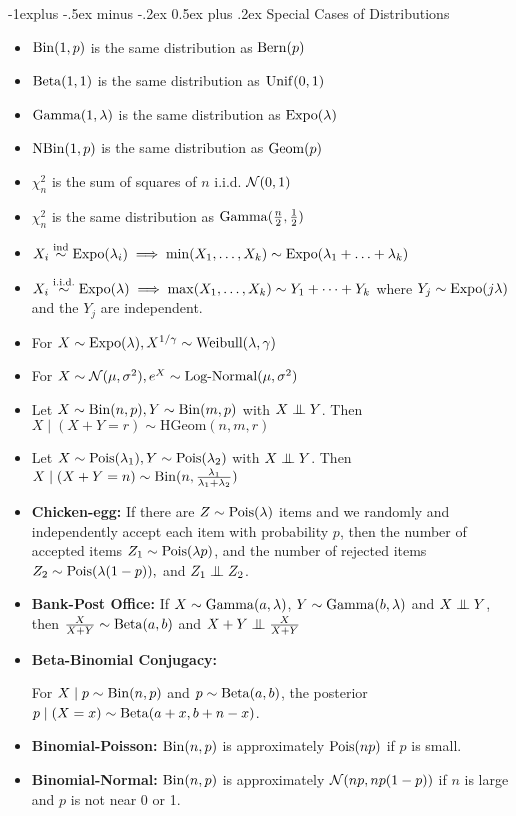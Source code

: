 \documentclass[10pt,landscape]{article}
\makeatletter
\newcommand\independent{\protect\mathpalette{\protect\independenT}{\perp}}
\def\independenT#1#2{\mathrel{\setbox0\hbox{$#1#2$}%
    \copy0\kern-\wd0\mkern4mu\box0}}
\renewcommand{\subsection}{\@startsection{subsection}{2}{0mm}%
                                {-1explus -.5ex minus -.2ex}%
                                {0.5ex plus .2ex}%
                                {\normalfont\normalsize\bfseries}}
\makeatother
\begin{document}
\begin{multicols*}{3}
\subsection{Special Cases of Distributions}
\begin{itemize}
    \item $\operatorname{Bin}(1,p)$ is the same distribution as $\operatorname{Bern}(p)$
    \item $\operatorname{Beta}(1,1)$ is the same distribution as $\operatorname{Unif}(0,1)$
    \item $\operatorname{Gamma}(1,\lambda)$ is the same distribution as $\operatorname{Expo}(\lambda)$
    \item $\operatorname{NBin}(1,p)$ is the same distribution as $\operatorname{Geom}(p)$
    \item $\chi_n^2$ is the sum of squares of $n$ i.i.d. $\mathcal{N}(0,1)$
    \item $\chi_n^2$ is the same distribution as $\operatorname{Gamma}(\frac{n}{2},\frac{1}{2})$
    \item  $X_i\stackrel{\text{ind}}{\sim}\operatorname{Expo}(\lambda_i)\implies\min(X_1,\ldots,X_k)\sim\operatorname{Expo}(\lambda_1+\ldots+\lambda_k)$
    \item  $X_i\stackrel{\text{i.i.d.}}{\sim}\operatorname{Expo}(\lambda)\implies\max(X_1,\ldots,X_k)\sim Y_1+\cdots+Y_k$ where $Y_j\sim\operatorname{Expo}(j\lambda)$ and the $Y_j$ are independent.
    \item For $X\sim \operatorname{Expo}(\lambda),X^{1/\gamma}\sim\text{Weibull}(\lambda,\gamma)$
    \item For $X\sim \mathcal{N}(\mu,\sigma^2),e^X\sim\text{Log-Normal}(\mu,\sigma^2)$
    \item Let $X\sim \operatorname{Bin}(n,p), Y\sim\operatorname{Bin}(m,p)$ with $X\independent Y$. Then $X\mid(X+Y=r)\sim\text{HGeom}(n,m,r)$
    \item Let $X\sim \operatorname{Pois}(\lambda_1), Y\sim\operatorname{Pois}(\lambda_2)$ with $X\independent Y$. Then $X\mid(X+Y=n)\sim\operatorname{Bin}(n,\frac{\lambda_1}{\lambda_1+\lambda_2})$
    \item \textbf{Chicken-egg:} If there are $Z\sim\operatorname{Pois}(\lambda)$ items and we randomly and independently accept each item with probability $p$, then the number of accepted items $Z_1\sim\operatorname{Pois}(\lambda p)$, and the number of rejected items $Z_2\sim\operatorname{Pois}(\lambda(1-p)),$ and $Z_1\independent Z_2$.
    \item \textbf{Bank-Post Office:} If $X\sim \operatorname{Gamma}(a,\lambda)$, $Y\sim\operatorname{Gamma}(b,\lambda)$ and $X\independent Y$, then $\frac{X}{X+Y}\sim\operatorname{Beta}(a,b)$ and $X+Y\independent \frac{X}{X+Y}$
    \item \textbf{Beta-Binomial Conjugacy:}
    
    For $X\mid p\sim\operatorname{Bin}(n,p)$ and $p\sim\operatorname{Beta}(a,b)$, the posterior $p\mid (X=x)\sim\operatorname{Beta}(a+x,b+n-x)$.
    \item \textbf{Binomial-Poisson:} $\operatorname{Bin}(n,p)$ is approximately $\operatorname{Pois}(np)$ if $p$ is small.
    \item \textbf{Binomial-Normal:} $\operatorname{Bin}(n,p)$ is approximately $\mathcal{N}(np,np(1-p))$ if $n$ is large and $p$ is not near 0 or 1.
\end{itemize}


\end{multicols*}
\end{document}
